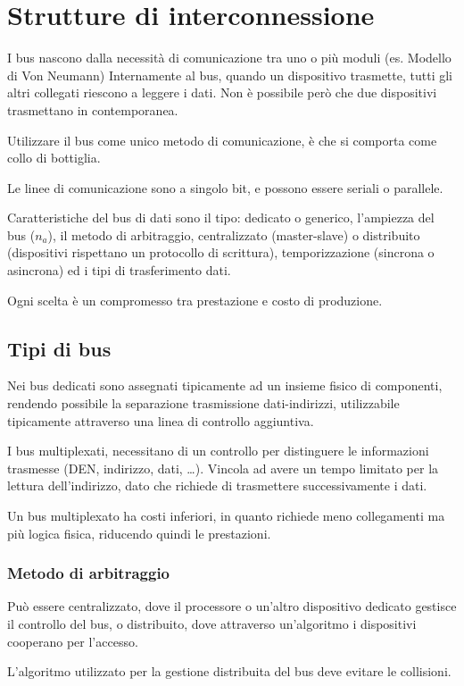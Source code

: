 \documentclass[../template]{subfiles}
\begin{document}
\section{Strutture di interconnessione}

I bus nascono dalla necessità di comunicazione tra uno o più moduli (es. Modello di Von Neumann)
Internamente al bus, quando un dispositivo trasmette, tutti gli altri collegati riescono a leggere i dati. Non è possibile però che due dispositivi trasmettano in contemporanea.

Utilizzare il bus come unico metodo di comunicazione, è che si comporta come collo di bottiglia.

Le linee di comunicazione sono a singolo bit, e possono essere seriali o parallele.

Caratteristiche del bus di dati sono il tipo: dedicato o generico, l'ampiezza del bus ($n_a$), il metodo di arbitraggio, centralizzato (master-slave) o distribuito (dispositivi rispettano un protocollo di scrittura), temporizzazione (sincrona o asincrona) ed i tipi di trasferimento dati.

Ogni scelta è un compromesso tra prestazione e costo di produzione.

\subsection{Tipi di bus}
Nei bus dedicati sono assegnati tipicamente ad un insieme fisico di componenti, rendendo possibile la separazione trasmissione dati-indirizzi, utilizzabile tipicamente attraverso una linea di controllo aggiuntiva.

I bus multiplexati, necessitano di un controllo per distinguere le informazioni trasmesse (DEN, indirizzo, dati, \ldots).
Vincola ad avere un tempo limitato per la lettura dell'indirizzo, dato che richiede di trasmettere successivamente i dati.

Un bus multiplexato ha costi inferiori, in quanto richiede meno collegamenti ma più logica fisica, riducendo quindi le prestazioni.

\subsubsection{Metodo di arbitraggio}
Può essere centralizzato, dove il processore o un'altro dispositivo dedicato gestisce il controllo del bus, o distribuito, dove attraverso un'algoritmo i dispositivi cooperano per l'accesso.

L'algoritmo utilizzato per la gestione distribuita del bus deve evitare le collisioni.
\end{document}
